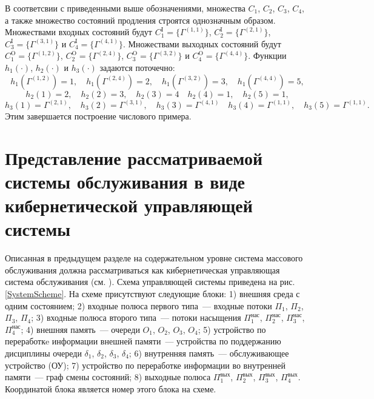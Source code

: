 \documentclass[a4paper,12pt,russian]{extarticle}
\begin{document}
В соответсвии с приведенными выше обозначениями, множества $C_1$, $C_2$, $C_3$, $C_4$, а также множество состояний продления строятся однозначным образом. Множествами входных состояний будут $C_1^{\mathrm{I}}=\{\Gamma^{(1,1)}\}$, $C_2^{\mathrm{I}}=\{\Gamma^{(2,1)}\}$, $C_3^{\mathrm{I}}=\{\Gamma^{(3,1)}\}$ и $C_4^{\mathrm{I}}=\{\Gamma^{(4,1)}\}$. Множествами выходных состояний будут $C_1^{\mathrm{O}}=\{\Gamma^{(1,2)}\}$, $C_2^{\mathrm{O}}=\{\Gamma^{(2,4)}\}$, $C_3^{\mathrm{O}}=\{\Gamma^{(3,2)}\}$ и $C_4^{\mathrm{O}}=\{\Gamma^{(4,4)}\}$. Функции $h_1(\cdot)$, $h_2(\cdot)$ и $h_3(\cdot)$ задаются поточечно:
\begin{equation*}
h_1(\Gamma^{(1,2)})=1, \quad h_1(\Gamma^{(2,4)})=2, \quad h_1(\Gamma^{(3,2)})=3, \quad h_1(\Gamma^{(4,4)})=5,
\end{equation*}
\begin{equation*}
h_2(1)=2, \quad h_2(2)=3, \quad h_2(3)=4 \quad h_2(4)=1, \quad h_2(5)=1,
\end{equation*}
\begin{equation*}
h_3(1)=\Gamma^{(2,1)}, \quad h_3(2)=\Gamma^{(3,1)}, \quad h_3(3)=\Gamma^{(4,1)} \quad h_3(4)=\Gamma^{(1,1)}, \quad h_3(5)=\Gamma^{(1,1)}.
\end{equation*}
Этим завершается построение числового примера.

\section{Представление рассматриваемой системы обслуживания в виде кибернетической управляющей системы}
Описанная в предыдущем разделе на содержательном уровне система массового обслуживания должна рассматриваться как кибернетическая управляющая система обслуживания (см. \cite{Zorine:2011:2}). Схема управляющей системы приведена на рис. \ref{SystemScheme}. На схеме присутствуют следующие блоки: 1) внешняя среда с одним состоянием; 2) входные полюса первого типа~--- входные потоки $\Pi_1$, $\Pi_2$, $\Pi_3$, $\Pi_4$; 3) входные полюса второго типа~--- потоки насыщения $\Pi_1^{\mathrm{\text{нас}}}$, $\Pi_2^{\mathrm{\text{нас}}}$, $\Pi_3^{\mathrm{\text{нас}}}$, $\Pi_4^{\mathrm{\text{нас}}}$; 4) внешняя память~--- очереди $O_1$, $O_2$, $O_3$, $O_4$; 5) устройство по переработкe информации внешней памяти~--- устройства по поддержанию дисциплины очереди $\delta_1$, $\delta_2$, $\delta_3$, $\delta_4$; 6) внутренняя память~--- обслуживающее устройство (ОУ); 7) устройство по переработке информации во внутренней памяти~--- граф смены состояний; 8) выходные полюса $\Pi_1^{\mathrm{\text{вых}}}$, $\Pi_2^{\mathrm{\text{вых}}}$, $\Pi_3^{\mathrm{\text{вых}}}$, $\Pi_4^{\mathrm{\text{вых}}}$. Координатой блока является номер этого блока на схеме. 
\end{document}
